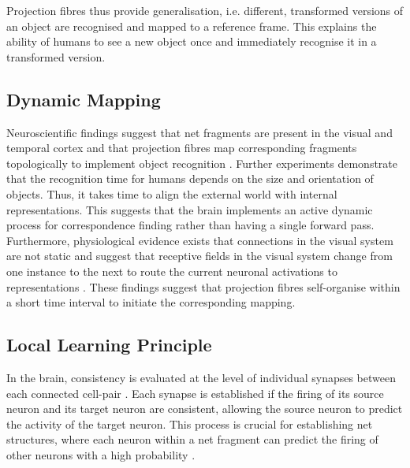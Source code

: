 Projection fibres thus provide generalisation, i.e. different, transformed versions of an object are recognised and mapped to a reference frame. This explains the ability of humans to see a new object once and immediately recognise it in a transformed version.

\subsection{Dynamic Mapping}
Neuroscientific findings suggest that net fragments  are present in the visual and temporal cortex and that projection fibres map corresponding fragments topologically to implement object recognition .
Further experiments demonstrate that the recognition time for humans depends on the size  and orientation  of objects. Thus, it takes time to align the external world with internal representations.
This suggests that the brain implements an active dynamic process for correspondence finding rather than having a single forward pass.
Furthermore, physiological evidence exists that connections in the visual system are not static and suggest that receptive fields in the visual system change from one instance to the next to route the current neuronal activations to representations .
These findings suggest that projection fibres self-organise within a short time interval to initiate the corresponding mapping.


\subsection{Local Learning Principle}
In the brain, consistency is evaluated at the level of individual synapses between each connected cell-pair . Each synapse is established if the firing of its source neuron and its target neuron are consistent, allowing the source neuron to predict the activity of the target neuron. This process is crucial for establishing net structures, where each neuron within a net fragment can predict the firing of other neurons with a high probability .

